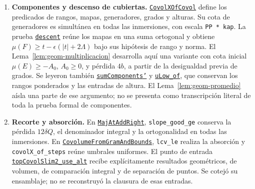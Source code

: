 \begingroup
\raggedright
\begin{enumerate}
\item \textbf{Componentes y descenso de cubiertas.}
\href{https://github.com/CocoSgt/riemann-hypothesis-lean/blob/7cbf7a0c32fca1badf05931879a37c3f8a2b03b4/src/Development/AbelianVarietyTheory/Definitions/Divisors/CovolXOfCovol.lean}{\texttt{CovolXOfCovol}}
define los predicados de rangos, mapas, generadores, grados
y alturas. Su cota de generadores es simultánea en todas
las inmersiones, con escala \texttt{PP * kap}.
La prueba
\href{https://github.com/CocoSgt/riemann-hypothesis-lean/blob/7cbf7a0c32fca1badf05931879a37c3f8a2b03b4/src/Development/AbelianVarietyTheory/Proofs/DivisorProofs/HtMapLeOfPoints.lean}{\texttt{descent}}
reúne los mapas en una suma ortogonal y obtiene
$\mu(F)\ge t-\epsilon(|t|+2\Lambda)$ bajo sus hipótesis
de rango y norma. El Lema~\ref{lem:geom-multiplicacion}
desarrolla aquí una variante con cota inicial
$\mu(E)\ge-A_0$, $A_0\ge0$, y pérdida $4b$,
a partir de la desigualdad previa de grados.
Se leyeron también
\href{https://github.com/CocoSgt/riemann-hypothesis-lean/blob/7cbf7a0c32fca1badf05931879a37c3f8a2b03b4/src/Formalism/MeanHeightDescent/AverageDegreeBounds/SumComponents.lean}{\texttt{sumComponents'}}
y
\href{https://github.com/CocoSgt/riemann-hypothesis-lean/blob/7cbf7a0c32fca1badf05931879a37c3f8a2b03b4/src/Development/AbelianVarietyTheory/Proofs/DivisorProofs/UniformLowerBoundOfSums.lean}{\texttt{uLow\_of}},
que conservan los rangos ponderados y las entradas de
altura. El Lema~\ref{lem:geom-promedio} aísla una parte
de ese argumento; no se presenta como transcripción literal
de toda la prueba formal de componentes.

\item \textbf{Recorte y absorción.}
En
\href{https://github.com/CocoSgt/riemann-hypothesis-lean/blob/7cbf7a0c32fca1badf05931879a37c3f8a2b03b4/src/Development/AbelianVarietyTheory/Proofs/DivisorProofs/MajAtAddRight.lean}{\texttt{MajAtAddRight}},
\texttt{slope\_good\_ge} conserva la pérdida $12\delta Q$,
el denominador integral y la ortogonalidad en todas las
inmersiones. En
\href{https://github.com/CocoSgt/riemann-hypothesis-lean/blob/7cbf7a0c32fca1badf05931879a37c3f8a2b03b4/src/Development/AbelianVarietyTheory/Proofs/DivisorProofs/CovolumeFromGramAndBounds.lean}{\texttt{CovolumeFromGramAndBounds}},
\texttt{lcv\_le} realiza la absorción y
\texttt{covolX\_of\_steps} reúne umbrales uniformes.
El punto de entrada
\href{https://github.com/CocoSgt/riemann-hypothesis-lean/blob/7cbf7a0c32fca1badf05931879a37c3f8a2b03b4/src/Development/AutomorphicArithmetic/ThetaCorrespondence/ThetaPairLifts/HodgeBundleWeights/TopCovolSlim2Use.lean}{\texttt{topCovolSlim2\_use\_alt}}
recibe explícitamente resultados geométricos, de volumen,
de comparación integral y de separación de puntos.
Se cotejó su ensamblaje; no se reconstruyó la clausura de
esas entradas.


\end{enumerate}
